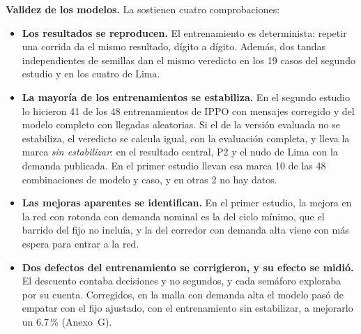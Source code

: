 \noindent\textbf{Validez de los modelos.} La sostienen cuatro
comprobaciones:
\begin{itemize}
  \item \textbf{Los resultados se reproducen.} El entrenamiento es
    determinista: repetir una corrida da el mismo resultado, dígito a
    dígito. Además, dos tandas independientes de semillas dan el mismo
    veredicto en los 19 casos del segundo estudio y en los cuatro de
    Lima.
  \item \textbf{La mayoría de los entrenamientos se estabiliza.} En el
    segundo estudio lo hicieron 41 de los 48 entrenamientos de IPPO con
    mensajes corregido y del modelo completo con llegadas aleatorias. Si
    el de la versión evaluada no se estabiliza, el veredicto se calcula
    igual, con la evaluación completa, y lleva la marca \emph{sin estabilizar}:
    en el resultado central, P2 y el nudo de Lima con la demanda
    publicada. En el
    primer estudio llevan esa marca 10 de las 48 combinaciones de modelo
    y caso, y en otras 2 no hay datos.
  \item \textbf{Las mejoras aparentes se identifican.} En el primer
    estudio, la mejora en la red con rotonda con demanda nominal es la
    del ciclo mínimo, que el barrido del fijo no incluía, y la del
    corredor con demanda alta viene con más espera para entrar a la red.
  \item \textbf{Dos defectos del entrenamiento se corrigieron, y su
    efecto se midió.} El descuento contaba decisiones y no segundos, y
    cada semáforo exploraba por su cuenta. Corregidos, en la malla con
    demanda alta el modelo pasó de empatar con el fijo ajustado, con el
    entrenamiento sin estabilizar, a mejorarlo un 6.7\,\% (Anexo~G).
\end{itemize}

